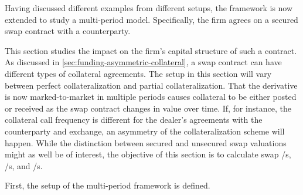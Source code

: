 \documentclass[main.tex]{subfiles}
\begin{document}
    Having discussed different examples from different setups,
    the framework is now extended to study a multi-period model.
    Specifically, the firm agrees on a secured swap contract with a counterparty.
    
    This section studies the impact on the firm's capital structure of such a contract.
    As discussed in \cref{sec:funding-asymmetric-collateral}, a swap contract can have different types of collateral agreements.
    The setup in this section will vary between perfect collateralization and partial collateralization.
    That the derivative is now marked-to-market in multiple periods causes collateral to be either posted or received as the swap contract changes in value over time.
    If, for instance, the collateral call frequency is different for the dealer's agreements with the counterparty and exchange, an asymmetry of the collateralization scheme will happen.
    While the distinction between secured and unsecured swap valuations might as well be of interest,
    the objective of this section is to calculate swap \FVA/s, \CVA/s, and \DVA/s.

    First, the setup of the multi-period framework is defined.

\end{document}
